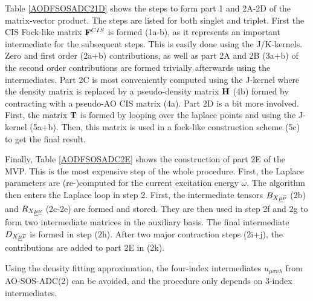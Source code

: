 Table \ref{AODFSOSADC21D} shows the steps to form part 1 and 2A-2D of the matrix-vector product. The steps are listed for both singlet and triplet. First the CIS Fock-like matrix $\mathbf{F}^{CIS}$ is formed (1a-b), as it represents an important intermediate for the subsequent steps. This is easily done using the J/K-kernels. Zero and first order (2a+b) contributions, as well as part 2A and 2B (3a+b) of the second order contributions are formed trivially afterwards using the intermediates. Part 2C is most conveniently computed using the J-kernel where the density matrix is replaced by a pseudo-density matrix $\mathbf{H}$ (4b) formed by contracting with a pseudo-AO CIS matrix (4a). Part 2D is a bit more involved. First, the matrix $\mathbf{T}$ is formed by looping over the laplace points and using the J-kernel (5a+b). Then, this matrix is used in a fock-like construction scheme (5c) to get the final result.

Finally, Table \ref{AODFSOSADC2E} shows the construction of part 2E of the MVP. This is the most expensive step of the whole procedure. First, the Laplace parameters are (re-)computed for the current excitation energy $\omega$. The algorithm then enters the Laplace loop in step 2. First, the intermediate tensors $B_{X\underline{\mu}\overline{\nu}}$ (2b) and $R_{X\underline{\mu}\underline{\nu}}$ (2c-2e) are formed and stored. They are then used in step 2f and 2g to form two intermediate matrices in the auxiliary basis. The final intermediate $D_{X\underline{\mu}\overline{\nu}}$ is formed in step (2h). After two major contraction steps (2i+j), the contributions are added to part 2E in (2k). 

Using the density fitting approximation, the four-index intermediates $u_{\mu\sigma\nu\lambda}$ from AO-SOS-ADC(2) can be avoided, and the procedure only depends on 3-index intermediates. 

